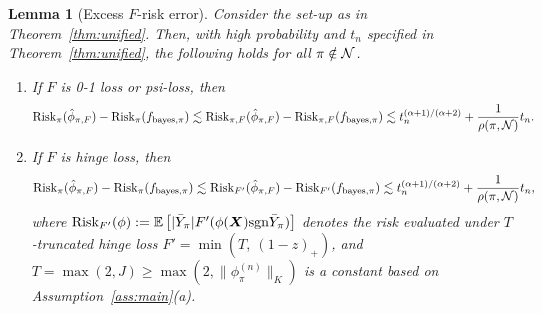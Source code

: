 \documentclass[11pt]{article}
\theoremstyle{plain}
\newtheorem{lem}{Lemma}
\theoremstyle{definition}
\def\sign{\textup{sgn}}
\def\bayespif{f_{\textup{bayes},\pi}}
\def\risk{\textup{Risk}_\pi}
\def\shift{\bar Y_\pi}
\def\riskF{\textup{Risk}_{\pi,F}}
\begin{document}
\begin{lem}[Excess $F$-risk error]\label{lem:risk}Consider the set-up as in Theorem~\ref{thm:unified}. Then, with high probability and $t_n$ specified in Theorem~\ref{thm:unified}, the following holds for all $\pi\notin\mathcal{N}$. 
\begin{enumerate}[label={2.\arabic*},wide, labelwidth=!, labelindent=0pt]
\item[(a)] If $F$ is 0-1 loss or psi-loss, then
\[
\risk(\hat \phi_{\pi,F})-\risk(\bayespif)\lesssim \riskF(\hat \phi_{\pi,F})-\riskF(\bayespif) \lesssim t_n^{(\alpha+1)/(\alpha+2)}+ {1\over \rho(\pi,\tN)}t_n.
\]
\item[(b)] If $F$ is hinge loss, then
\[
\risk(\hat \phi_{\pi,F})-\risk(\bayespif)\lesssim \textup{Risk}_{F'}(\hat \phi_{\pi,F})-\textup{Risk}_{F'}(\bayespif) \lesssim t_n^{(\alpha+1)/(\alpha+2)}+ {1\over \rho(\pi,\tN)}t_n,
\]
where $\text{Risk}_{F'}(\phi):=\mathbb{E}\left[|\shift|F'( \phi(\mX)\sign\shift)\right]$ denotes the risk evaluated under $T$-truncated hinge loss $F'=\min(T,\ (1-z)_{+})$, and $T=\max(2,J) \geq \max(2, \|{\phi_\pi^{(n)}}\|_{K})$ is a constant based on Assumption~\ref{ass:main}(a). 
\end{enumerate}
\end{lem}
\end{document}
